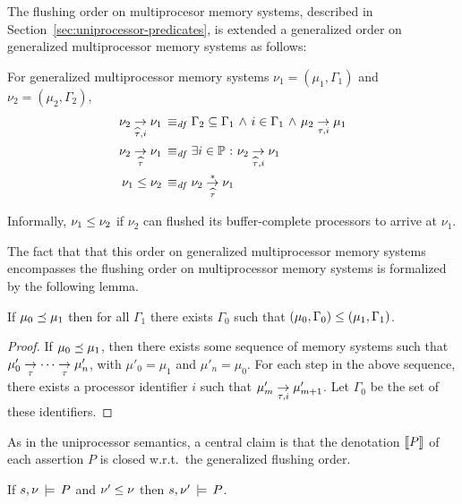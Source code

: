 \documentclass[11pt]{report}
\begin{document}
The flushing order on multiprocesor memory systems, described in Section~\ref{sec:uniprocessor-predicates}, is extended a generalized order on generalized multiprocessor memory systems as follows: 
\begin{definition}
  For generalized multiprocessor memory systems $\nu_1 = (\mu_1,\Gamma_1)$ and $\nu_2 = (\mu_2,\Gamma_2)$, \begin{align*}
    \nu_2 \underset{\widehat{\tau},i}{\rightarrow} \nu_1 \operatorname{\;\equiv_{\mathit{df}}\;} & \Gamma_2 \subseteq \Gamma_1 \operatorname{\,\wedge\,} i \in \Gamma_1 \operatorname{\,\wedge\,} \mu_2 \underset{\tau,i}{\rightarrow} \mu_1 \\ 
    \nu_2 \underset{\widehat{\tau}}{\rightarrow} \nu_1 \operatorname{\;\equiv_{\mathit{df}}\;} & \exists i \in \mathbb{P} \operatorname{\,:\,} \nu_2 \underset{\widehat{\tau},i}{\rightarrow} \nu_1 \\ 
    \nu_1 \leq \nu_2 \operatorname{\;\equiv_{\mathit{df}}\;} & \nu_2 \overset{\ast}{\underset{\widehat{\tau}}{\rightarrow}} \nu_1
  \end{align*} 
\end{definition} Informally, $\nu_1 \leq \nu_2$ if $\nu_2$ can flushed its buffer-complete processors to arrive at $\nu_1$. 

The fact that that this order on generalized multiprocessor memory systems encompasses the flushing order on multiprocessor memory systems is formalized by the following lemma. 

\begin{lemma}
  \label{lem:generalized-order-encompasses-flushing-order}
  If $\mu_0 \preceq \mu_1$ then for all $\Gamma_1$ there exists $\Gamma_0$ such that $(\mu_0,\Gamma_0) \leq (\mu_1,\Gamma_1)$. 
\end{lemma}

\begin{proof}
  If $\mu_0 \preceq \mu_1$, then there exists some sequence of memory systems such that $\mu'_0 \underset{\tau}{\rightarrow} \cdots \underset{\tau}{\rightarrow} \mu'_n$, with $\mu'_0 = \mu_1$ and $\mu'_n = \mu_0$. For each step in the above sequence, there exists a processor identifier $i$ such that $\mu'_m \underset{\tau,i}{\rightarrow} \mu'_{m+1}$. Let $\Gamma_0$ be the set of these identifiers. 
\end{proof}

As in the uniprocessor semantics, a central claim is that the denotation $[\![P]\!]$ of each assertion $P$ is closed w.r.t.\ the generalized flushing order. 

\begin{lemma}
  \label{lem:generalized-flushing-closure}
  If $s,\nu \,\models\, P$ and $\nu' \leq \nu$ then $s,\nu' \,\models\, P$. 
\end{lemma}
\end{document}
